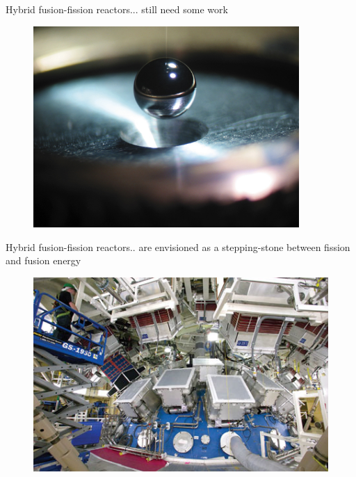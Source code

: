 \documentclass{beamer}
\begin{document}
        \begin{frame}{Hybrid fusion-fission reactors}{... still need some work}
            \begin{figure}
                \centering
                \includegraphics[width=0.9\textwidth]{./img/lifeFuel.png}
                \caption*{}
            \end{figure}
        \end{frame}

        \begin{frame}{Hybrid fusion-fission reactors}{.. are envisioned as a stepping-stone between fission and fusion energy}
            \begin{figure}
                \centering
                \includegraphics[width=1.0\textwidth]{./img/nifChamber.png}
                \caption*{}
            \end{figure}
        \end{frame}
\end{document}
